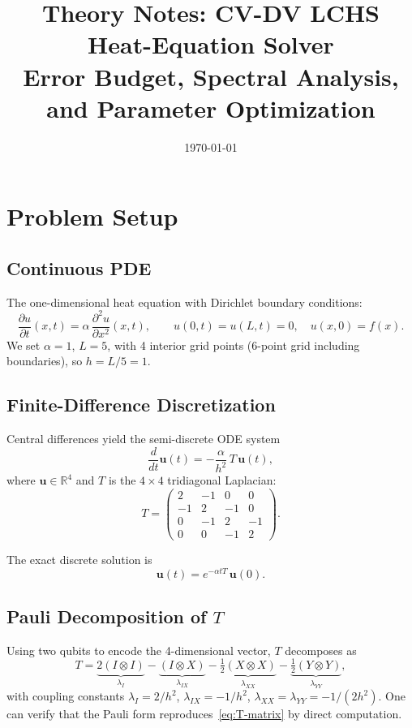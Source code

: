 \documentclass[11pt]{article}
\title{Theory Notes: CV-DV LCHS Heat-Equation Solver\\
  Error Budget, Spectral Analysis, and Parameter Optimization}
\date{\today}
\begin{document}
\maketitle

\section{Problem Setup}

\subsection{Continuous PDE}
The one-dimensional heat equation with Dirichlet boundary conditions:
\begin{equation}
\frac{\partial u}{\partial t}(x,t)=\alpha\,\frac{\partial^2 u}{\partial x^2}(x,t),
\qquad u(0,t)=u(L,t)=0,\quad u(x,0)=f(x).
\end{equation}
We set $\alpha=1$, $L=5$, with 4 interior grid points (6-point grid including boundaries), so $h=L/5=1$.

\subsection{Finite-Difference Discretization}
Central differences yield the semi-discrete ODE system
\begin{equation}
\frac{d}{dt}\bm{u}(t) = -\frac{\alpha}{h^2}\,T\,\bm{u}(t),
\end{equation}
where $\bm{u}\in\mathbb{R}^4$ and $T$ is the $4\times 4$ tridiagonal Laplacian:
\begin{equation}\label{eq:T-matrix}
T =
\begin{pmatrix}
 2 & -1 &  0 &  0 \\
-1 &  2 & -1 &  0 \\
 0 & -1 &  2 & -1 \\
 0 &  0 & -1 &  2
\end{pmatrix}.
\end{equation}

The exact discrete solution is
\begin{equation}\label{eq:pde-sol}
\bm{u}(t)=e^{-\alpha t T}\,\bm{u}(0).
\end{equation}

\subsection{Pauli Decomposition of $T$}
Using two qubits to encode the 4-dimensional vector, $T$ decomposes as
\begin{equation}\label{eq:T-pauli}
T = \underbrace{2(I\otimes I)}_{\lambda_I}
  - \underbrace{(I\otimes X)}_{\lambda_{IX}}
  - \underbrace{\tfrac{1}{2}(X\otimes X)}_{\lambda_{XX}}
  - \underbrace{\tfrac{1}{2}(Y\otimes Y)}_{\lambda_{YY}},
\end{equation}
with coupling constants $\lambda_I=2/h^2$, $\lambda_{IX}=-1/h^2$, $\lambda_{XX}=\lambda_{YY}=-1/(2h^2)$.
One can verify that the Pauli form reproduces~\eqref{eq:T-matrix} by direct computation.
\end{document}
